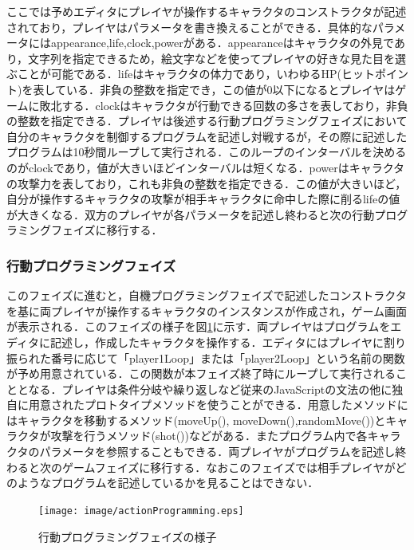 ここでは予めエディタにプレイヤが操作するキャラクタのコンストラクタが記述されており，プレイヤはパラメータを書き換えることができる．具体的なパラメータにはappearance,life,clock,powerがある．appearanceはキャラクタの外見であり，文字列を指定できるため，絵文字などを使ってプレイヤの好きな見た目を選ぶことが可能である．lifeはキャラクタの体力であり，いわゆるHP(ヒットポイント)を表している．非負の整数を指定でき，この値が0以下になるとプレイヤはゲームに敗北する．clockはキャラクタが行動できる回数の多さを表しており，非負の整数を指定できる．プレイヤは後述する行動プログラミングフェイズにおいて自分のキャラクタを制御するプログラムを記述し対戦するが，その際に記述したプログラムは10秒間ループして実行される．このループのインターバルを決めるのがclockであり，値が大きいほどインターバルは短くなる．powerはキャラクタの攻撃力を表しており，これも非負の整数を指定できる．この値が大きいほど，自分が操作するキャラクタの攻撃が相手キャラクタに命中した際に削るlifeの値が大きくなる．双方のプレイヤが各パラメータを記述し終わると次の行動プログラミングフェイズに移行する．



\subsubsection{行動プログラミングフェイズ}
このフェイズに進むと，自機プログラミングフェイズで記述したコンストラクタを基に両プレイヤが操作するキャラクタのインスタンスが作成され，ゲーム画面が表示される．このフェイズの様子を図\ref{actionProgramming}に示す．両プレイヤはプログラムをエディタに記述し，作成したキャラクタを操作する．エディタにはプレイヤに割り振られた番号に応じて「player1Loop」または「player2Loop」という名前の関数が予め用意されている．この関数が本フェイズ終了時にループして実行されることとなる．プレイヤは条件分岐や繰り返しなど従来のJavaScriptの文法の他に独自に用意されたプロトタイプメソッドを使うことができる．用意したメソッドにはキャラクタを移動するメソッド(moveUp(), moveDown(),randomMove())とキャラクタが攻撃を行うメソッド(shot())などがある．またプログラム内で各キャラクタのパラメータを参照することもできる．両プレイヤがプログラムを記述し終わると次のゲームフェイズに移行する．なおこのフェイズでは相手プレイヤがどのようなプログラムを記述しているかを見ることはできない．

\begin{figure}[!h]
  \begin{center}
    \texttt{[image: image/actionProgramming.eps]}
  \end{center}
    \vspace{-8mm} 
  \caption{行動プログラミングフェイズの様子}
  \label{actionProgramming}
\end{figure}

